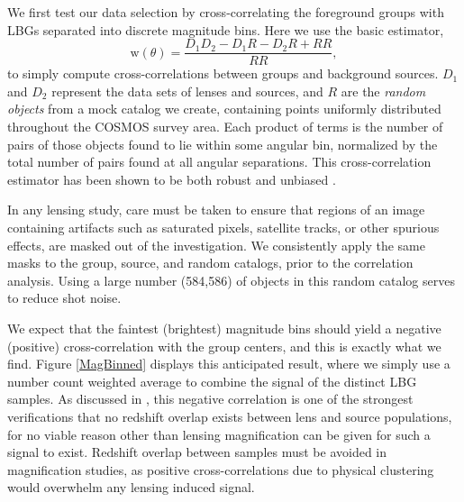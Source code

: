 We first test our data selection by cross-correlating the foreground groups with LBGs separated into discrete magnitude bins. Here we use the basic \citet{LandySzalay93} estimator, 
\begin{equation}
\mathrm{w}(\theta)=\frac{D_1 D_2 - D_1 R - D_2 R + RR}{RR},
\end{equation}
to simply compute cross-correlations between groups and background sources. $D_1$ and $D_2$ represent the data sets of lenses and sources, and $R$ are the {\it random objects} from a mock catalog we create, containing points uniformly distributed throughout the COSMOS survey area. Each product of terms is the number of pairs of those objects found to lie within some angular bin, normalized by the total number of pairs found at all angular separations.  This cross-correlation estimator has been shown to be both robust and unbiased \citep{Kerscher00}.  

In any lensing study, care must be taken to ensure that regions of an image containing artifacts such as saturated pixels, satellite tracks, or other spurious effects, are masked out of the investigation.  We consistently apply the same masks to the group, source, and random catalogs, prior to the correlation analysis. Using a large number (584,586) of objects in this random catalog serves to reduce shot noise.  

We expect that the faintest (brightest) magnitude bins should yield a negative (positive) cross-correlation with the group centers, and this is exactly what we find.  Figure \ref{MagBinned} displays this anticipated result, where we simply use a number count weighted average to combine the signal of the distinct LBG samples.  As discussed in \citet{Hildebrandt09b}, this negative correlation is one of the strongest verifications that no redshift overlap exists between lens and source populations, for no viable reason other than lensing magnification can be given for such a signal to exist.  Redshift overlap between samples must be avoided in magnification studies, as positive cross-correlations due to physical clustering would overwhelm any lensing induced signal.

